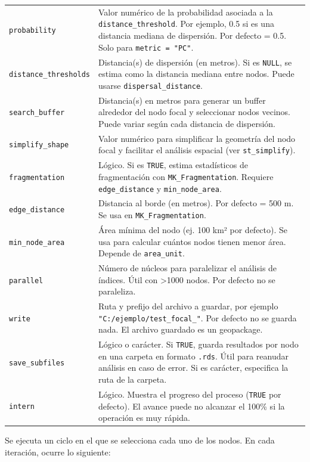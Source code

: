 \documentclass[
]{book}
\begin{document}
\begin{longtable}[]{@{}
  >{\raggedright\arraybackslash}p{}
  >{\raggedright\arraybackslash}p{}@{}}
\texttt{probability} & Valor numérico de la probabilidad asociada a la \texttt{distance\_threshold}. Por ejemplo, 0.5 si es una distancia mediana de dispersión. Por defecto = 0.5. Solo para \texttt{metric\ =\ "PC"}. \\
\texttt{distance\_thresholds} & Distancia(s) de dispersión (en metros). Si es \texttt{NULL}, se estima como la distancia mediana entre nodos. Puede usarse \texttt{dispersal\_distance}. \\
\texttt{search\_buffer} & Distancia(s) en metros para generar un buffer alrededor del nodo focal y seleccionar nodos vecinos. Puede variar según cada distancia de dispersión. \\
\texttt{simplify\_shape} & Valor numérico para simplificar la geometría del nodo focal y facilitar el análisis espacial (ver \texttt{st\_simplify}). \\
\texttt{fragmentation} & Lógico. Si es \texttt{TRUE}, estima estadísticos de fragmentación con \texttt{MK\_Fragmentation}. Requiere \texttt{edge\_distance} y \texttt{min\_node\_area}. \\
\texttt{edge\_distance} & Distancia al borde (en metros). Por defecto = 500 m. Se usa en \texttt{MK\_Fragmentation}. \\
\texttt{min\_node\_area} & Área mínima del nodo (ej. 100 km² por defecto). Se usa para calcular cuántos nodos tienen menor área. Depende de \texttt{area\_unit}. \\
\texttt{parallel} & Número de núcleos para paralelizar el análisis de índices. Útil con \textgreater1000 nodos. Por defecto no se paraleliza. \\
\texttt{write} & Ruta y prefijo del archivo a guardar, por ejemplo \texttt{"C:/ejemplo/test\_focal\_"}. Por defecto no se guarda nada. El archivo guardado es un geopackage. \\
\texttt{save\_subfiles} & Lógico o carácter. Si \texttt{TRUE}, guarda resultados por nodo en una carpeta en formato \texttt{.rds}. Útil para reanudar análisis en caso de error. Si es carácter, especifica la ruta de la carpeta. \\
\texttt{intern} & Lógico. Muestra el progreso del proceso (\texttt{TRUE} por defecto). El avance puede no alcanzar el 100\% si la operación es muy rápida. \\
\end{longtable}

Se ejecuta un ciclo en el que se selecciona cada uno de los nodos. En cada iteración, ocurre lo siguiente:
\end{document}
